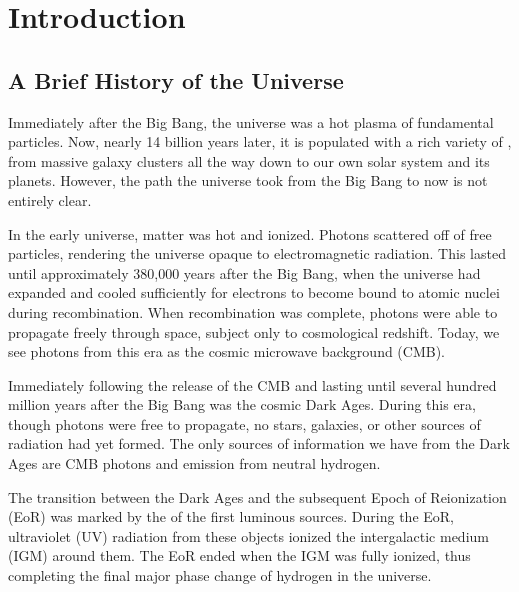\documentclass[12pt]{article}
\begin{document}
\clearpage
{}

\begingroup
\hypersetup{
	citecolor=DarkBlue,
	filecolor=black,
	linkcolor=black,
	urlcolor=DarkBlue
}
\tableofcontents
\listoffigures
\listoftables
\endgroup
\newpage

\begin{abstract}
\end{abstract}

\clearpage
{}

\section{Introduction} \label{sec:intro}

\subsection{A Brief History of the Universe} \label{subsec:universe}

Immediately after the Big Bang, the universe was a hot plasma of fundamental particles. Now, nearly 14 billion years later, it is populated with a rich variety of , from massive galaxy clusters all the way down to our own solar system and its planets. However, the  path the universe took from the Big Bang to now is not entirely clear.

In the early universe, matter was hot and ionized. Photons scattered off of free particles, rendering the universe opaque to electromagnetic radiation. This lasted until approximately 380,000 years after the Big Bang, when the universe had expanded and cooled sufficiently for electrons to become bound to atomic nuclei during recombination. When recombination was complete, photons were able to propagate freely through space, subject only to cosmological redshift. Today, we see photons from this era as the cosmic microwave background (CMB).

Immediately following the release of the CMB and lasting until several hundred million years after the Big Bang was the cosmic Dark Ages. During this era, though photons were free to propagate, no stars, galaxies, or other sources of radiation had yet formed. The only sources of information we have from the Dark Ages are CMB photons and emission from neutral hydrogen.

The transition between the Dark Ages and the subsequent Epoch of Reionization (EoR) was marked by the  of the first luminous sources. During the EoR, ultraviolet (UV) radiation from these objects ionized the intergalactic medium (IGM) around them. The EoR ended when the IGM was fully ionized, thus completing the final major phase change of hydrogen in the universe.
\end{document}
